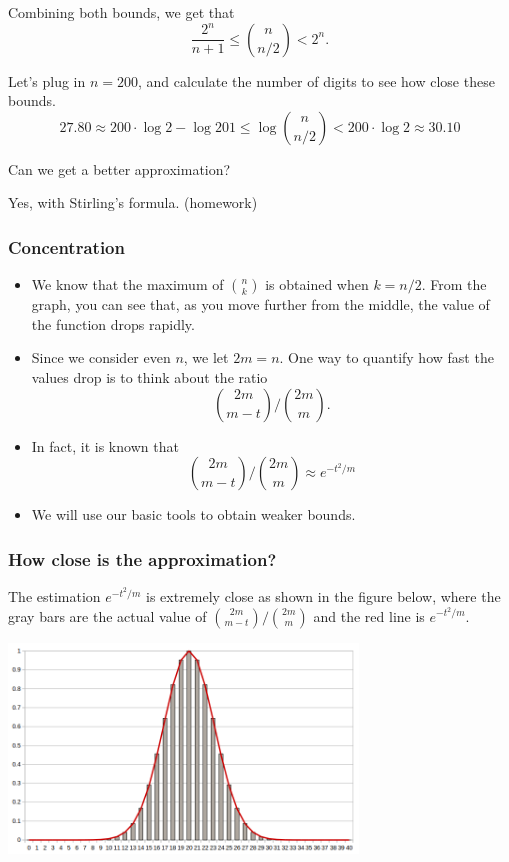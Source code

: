 \begin{frame}
  Combining both bounds, we get that
  \[\frac{2^n}{n+1}\leq \binom{n}{n/2} < 2^n.\]

  \pause Let's plug in $n=200$, and calculate the number of digits to
  see how close these bounds.
  \[27.80 \approx 200\cdot\log 2 - \log 201 \leq \log\binom{n}{n/2} < 200\cdot \log 2\approx 30.10\]
  \pause

  Can we get a better approximation? \pause

  Yes, with Stirling's formula. (homework)
\end{frame}

\begin{frame}\frametitle{Concentration}
  \begin{itemize}
  \item We know that the maximum of $\binom{n}{k}$ is obtained when
    $k=n/2$.  From the graph, you can see that, as you move further
    from the middle, the value of the function drops rapidly.
  \item Since we consider even $n$, we let $2m=n$.  One way to
    quantify how fast the values drop is to think about the ratio
    \[ \binom{2m}{m-t}\Big/\binom{2m}{m}. \] \pause
  \item In fact, it is known that
    \[ \binom{2m}{m-t}\Big/\binom{2m}{m} \approx e^{-t^2/m} \]
    \pause
  \item We will use our basic tools to obtain weaker bounds.
  \end{itemize}
\end{frame}

\begin{frame}\frametitle{How close is the approximation?}
  The estimation $e^{-t^2/m}$ is extremely close as shown in the
  figure below, where the gray bars are the actual value of
  $\binom{2m}{m-t}/\binom{2m}{m}$ and the red line is $e^{-t^2/m}$.

  \includegraphics[height=2.2in]{images/binom-approx.png}
\end{frame}

